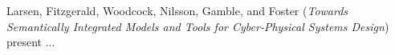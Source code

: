 

Larsen, Fitzgerald, Woodcock, Nilsson, Gamble, and Foster
\cite{isola-2016-larsen}
({\em Towards Semantically Integrated Models and Tools for
Cyber-Physical Systems Design})
present ...

